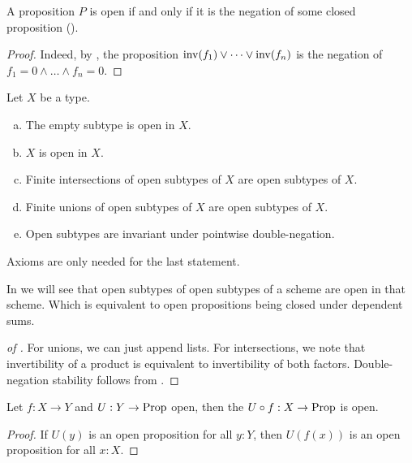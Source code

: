 \begin{proposition}%
  \label{open-iff-negation-of-closed}
  A proposition $P$ is open
  if and only if
  it is the negation of some closed proposition
  ().
\end{proposition}

\begin{proof}
  Indeed, by ,
  the proposition $\mathrm{inv}(f_1) \lor \dots \lor \mathrm{inv}(f_n)$
  is the negation of ${f_1 = 0} \land \dots \land {f_n = 0}$.
\end{proof}

\begin{proposition}%
  \label{open-union-intersection}
  Let $X$ be a type.
  \begin{enumerate}[(a)]
  \item The empty subtype is open in $X$.
  \item $X$ is open in $X$.
  \item Finite intersections of open subtypes of $X$ are open subtypes of $X$.
  \item Finite unions of open subtypes of $X$ are open subtypes of $X$.
  \item Open subtypes are invariant under pointwise double-negation.
  \end{enumerate}
  Axioms are only needed for the last statement.
\end{proposition}

In  we will see that open subtypes of open subtypes of a scheme are open in that scheme.
Which is equivalent to open propositions being closed under dependent sums.

\begin{proof}[of ]
  For unions, we can just append lists.
  For intersections, we note that invertibility of a product
  is equivalent to invertibility of both factors.
  Double-negation stability
  follows from .
\end{proof}

\begin{lemma}%
  \label{preimage-open}
  Let $f:X\to Y$ and $U:Y\to\mathrm{Prop}$ open,
  then the  $U\circ f:X\to\mathrm{Prop}$ is open.
\end{lemma}

\begin{proof}
  If $U(y)$ is an open proposition for all $y : Y$,
  then $U(f(x))$ is an open proposition for all $x : X$.
\end{proof}

